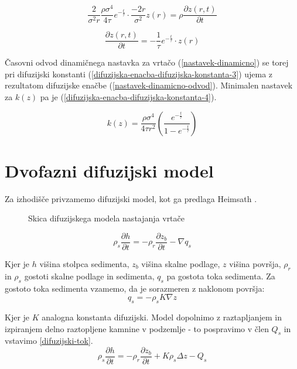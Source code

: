 \documentclass[a4paper, oneside, 12pt]{book}
\begin{document}
\[
  \frac{2}{\sigma^2 r} \frac{\rho \sigma^4}{4 \tau} e^{-\frac{t}{\tau}} \cdot \frac{-2r}{\sigma^2} z(r) = \rho \frac{\partial z(r,t)}{\partial t}
\]

\begin{equation}
  \frac{\partial z(r,t)}{\partial t} = - \frac{1}{\tau} e^{-\frac{t}{\tau}} \cdot z(r)
  \label{nastavek-dinamicno-odvod}
\end{equation}

Časovni odvod dinamičnega nastavka za vrtačo (\ref{nastavek-dinamicno}) se torej pri difuzijski konstanti (\ref{difuzijska-enacba-difuzijska-konstanta-3}) ujema z rezultatom difuzijske enačbe (\ref{nastavek-dinamicno-odvod}). Minimalen nastavek za $k(z)$ pa je (\ref{difuzijska-enacba-difuzijska-konstanta-4}).

\begin{equation}
  k(z) = \frac{\rho \sigma^4}{4 \tau r^2} \left( \frac{e^{-\frac{t}{\tau}}}{1-e^{-\frac{t}{\tau}}} \right)
  \label{difuzijska-enacba-difuzijska-konstanta-4}
\end{equation}


\newpage

\section{Dvofazni difuzijski model}

Za izhodišče privzamemo difuzijski model, kot ga predlaga Heimsath \cite{Heimsath2001}.

\begin{figure}[H]
  \centering
  
  \caption{Skica difuzijskega modela nastajanja vrtače}
  \label{fig:difuzijski-model}
\end{figure}

\begin{equation}
  \rho_s \frac{\partial h}{\partial t} = -\rho_r \frac{\partial z_b}{\partial t} - \nabla q_s
  \label{kontinuitetna-enacba-original}
\end{equation}

Kjer je $h$ višina stolpca sedimenta, $z_b$ višina skalne podlage, $z$ višina površja, $\rho_r$ in $\rho_s$ gostoti skalne podlage in sedimenta, $q_s$ pa gostota toka sedimenta. Za gostoto toka sedimenta vzamemo, da je sorazmeren z naklonom površja:
\begin{equation}
  q_s = - \rho_s K \nabla z
  \label{difuzijski-tok}
\end{equation}

Kjer je $K$ analogna konstanta difuzijski.
Model dopolnimo z raztapljanjem in izpiranjem delno raztopljene kamnine v podzemlje - to pospravimo v člen $Q_s$ in vstavimo \ref{difuzijski-tok}.
\begin{equation}
  \rho_s \frac{\partial h}{\partial t} = -\rho_r \frac{\partial z_b}{\partial t} + K \rho_s \Delta z - Q_s
  \label{kontinuitetna-enacba}
\end{equation}
\end{document}
